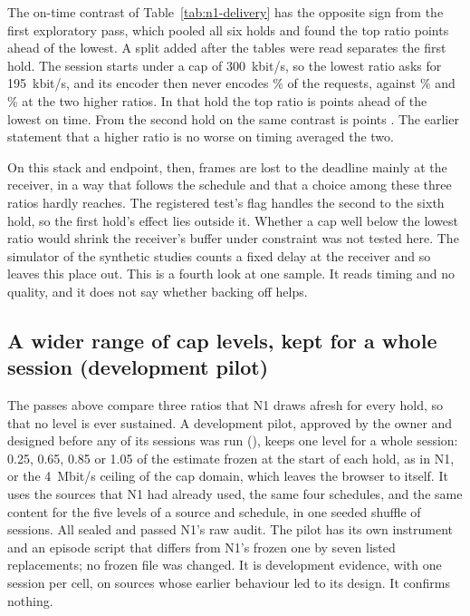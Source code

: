 \ifdefined\NOneDelStartDiff
The on-time contrast of Table~\ref{tab:n1-delivery} has the opposite sign from the first exploratory pass, which pooled all six holds and found the top ratio \NOneDelPooledDiff{} points \NOneDelPooledDiffT{} ahead of the lowest. A split added after the tables were read separates the first hold. The session starts under a cap of 300~kbit/s, so the lowest ratio asks for 195~kbit/s, and its encoder then never encodes \NOneDelStartNeverLow\% of the requests, against \NOneDelStartNeverMid\% and \NOneDelStartNeverTop\% at the two higher ratios. In that hold the top ratio is \NOneDelStartDiff{} points \NOneDelStartDiffT{} ahead of the lowest on time. From the second hold on the same contrast is \NOneDelAfterDiff{} points \NOneDelAfterDiffT. The earlier statement that a higher ratio is no worse on timing averaged the two.
\fi

On this stack and endpoint, then, frames are lost to the deadline mainly at the receiver, in a way that follows the schedule and that a choice among these three ratios hardly reaches. The registered test's flag handles the second to the sixth hold, so the first hold's effect lies outside it. Whether a cap well below the lowest ratio would shrink the receiver's buffer under constraint was not tested here. The simulator of the synthetic studies counts a fixed delay at the receiver and so leaves this place out. This is a fourth look at one sample. It reads timing and no quality, and it does not say whether backing off helps.
\fi

\ifdefined\RangePilotSessions
\subsection{A wider range of cap levels, kept for a whole session (development pilot)}
\label{sec:range-pilot}
The passes above compare three ratios that N1 draws afresh for every hold, so that no level is ever sustained. A development pilot, approved by the owner and designed before any of its sessions was run (), keeps one level for a whole session: 0.25, 0.65, 0.85 or 1.05 of the estimate frozen at the start of each hold, as in N1, or the 4~Mbit/s ceiling of the cap domain, which leaves the browser to itself. It uses the \RangePilotSources{} sources that N1 had already used, the same four schedules, and the same content for the five levels of a source and schedule, in one seeded shuffle of \RangePilotPlanned{} sessions. All \RangePilotSessions{} sealed and passed N1's raw audit. The pilot has its own instrument and an episode script that differs from N1's frozen one by seven listed replacements; no frozen file was changed. It is development evidence, with one session per cell, on sources whose earlier behaviour led to its design. It confirms nothing.

